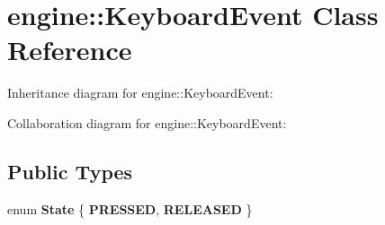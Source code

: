 \hypertarget{classengine_1_1_keyboard_event}{}\section{engine\+:\+:Keyboard\+Event Class Reference}
\label{classengine_1_1_keyboard_event}


Inheritance diagram for engine\+:\+:Keyboard\+Event\+:


Collaboration diagram for engine\+:\+:Keyboard\+Event\+:
\subsection*{Public Types}
\begin{DoxyCompactItemize}
\item 
enum {\bfseries State} \{ {\bfseries P\+R\+E\+S\+S\+ED}, 
{\bfseries R\+E\+L\+E\+A\+S\+ED}
 \}\hypertarget{classengine_1_1_keyboard_event_a18429e01d5cb4f456f24834b3138be9f}{}\label{classengine_1_1_keyboard_event_a18429e01d5cb4f456f24834b3138be9f}


\end{DoxyCompactItemize}

